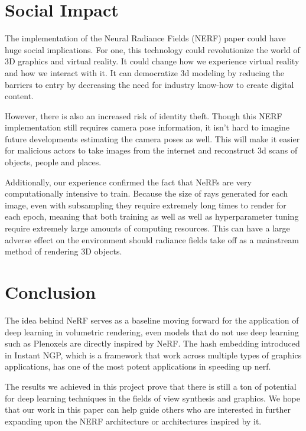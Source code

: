 \section{Social Impact}

The implementation of the Neural Radiance Fields (NERF) paper could have huge social implications. For one, this technology could revolutionize the world of 3D graphics and virtual reality. It could change how we experience virtual reality and how we interact with it. It can democratize 3d modeling by reducing the barriers to entry by decreasing the need for industry know-how to create digital content.

However, there is also an increased risk of identity theft. Though this NERF implementation still requires camera pose information, it isn’t hard to imagine future developments estimating the camera poses as well. This will make it easier for malicious actors to take images from the internet and reconstruct 3d scans of objects, people and places.

Additionally, our experience confirmed the fact that NeRFs are very computationally intensive to train. Because the size of rays generated for each image, even with subsampling they require extremely long times to render for each epoch, meaning that both training as well as well as hyperparameter tuning require extremely large amounts of computing resources. This can have a large adverse effect on the environment should radiance fields take off as a mainstream method of rendering 3D objects.


\section{Conclusion}

The idea behind NeRF serves as a baseline moving forward for the application of deep learning in volumetric rendering, even models that do not use deep learning such as Plenoxels are directly inspired by NeRF. The hash embedding introduced in Instant NGP, which is a framework that work across multiple types of graphics applications, has one of the most potent applications in speeding up nerf. 

The results we achieved in this project prove that there is still a ton of potential for deep learning techniques in the fields of view synthesis and graphics. We hope that our work in this paper can help guide others who are interested in further expanding upon the NERF architecture or architectures inspired by it.

